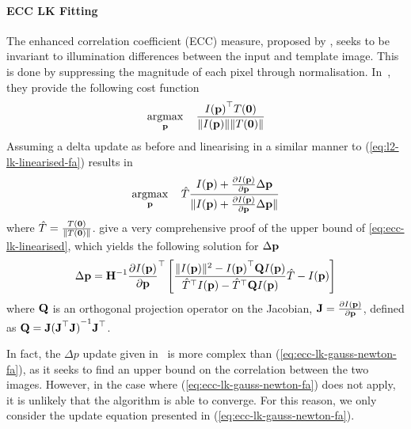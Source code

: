 \paragraph{ECC LK Fitting}\label{subsubsec:lk-ecc}
The enhanced correlation coefficient (ECC) measure, proposed by
\citet{evangelidis2008parametric}, seeks to be invariant to illumination differences
between the input and template image. This is done by suppressing the magnitude
of each pixel through normalisation. In~\cite{evangelidis2008parametric}, they provide the
following cost function
\begin{equation}\label{eq:ecc-lk-max}
   \argmax_{\p} \quad \frac{{I(\p)}^{\top} T(\zero)}{\norm{I(\p)} \norm{T(\zero)}}
\end{equation}
Assuming a delta update as before and linearising in a similar manner to
(\ref{eq:l2-lk-linearised-fa}) results in
\begin{equation}\label{eq:ecc-lk-linearised}
    \argmax_{\p} \quad \hat{T} \frac{I(\p) + \frac{\partial I(\p)}{\partial \p} \Delta \p}{\norm{{I(\p) + \frac{\partial I(\p)}{\partial \p} \Delta \p}}}
\end{equation}
where $\hat{T} = \frac{T(\boldsymbol{\mathbf{0}})}{\lVert{} T(\boldsymbol{\mathbf{0}}) \rVert}$.
\citet{evangelidis2008parametric} give a very comprehensive proof of
the upper bound of \cref{eq:ecc-lk-linearised}, which yields the
following solution for $\Delta \boldsymbol{\mathbf{p}}$
\begin{equation}\label{eq:ecc-lk-gauss-newton-fa}
    \Delta \boldsymbol{\mathbf{p}} = \boldsymbol{\mathbf{H}}^{-1} \frac{\partial I(\boldsymbol{\mathbf{p}})}{\partial \boldsymbol{\mathbf{p}}}^{\top} \left[ \frac{\lVert{} I(\boldsymbol{\mathbf{p}}) \rVert^2 - {I(\boldsymbol{\mathbf{p}})}^{\top} \boldsymbol{\mathbf{Q}} I(\boldsymbol{\mathbf{p}})}{\hat{T}^{\top} I(\boldsymbol{\mathbf{p}}) - \hat{T}^{\top} \boldsymbol{\mathbf{Q}} I(\boldsymbol{\mathbf{p}})} \hat{T} - I(\boldsymbol{\mathbf{p}}) \right]
\end{equation}
where $\boldsymbol{\mathbf{Q}}$ is an orthogonal projection operator on the Jacobian, $\boldsymbol{\mathbf{J}} =
\frac{\partial I(\boldsymbol{\mathbf{p}})}{\partial \boldsymbol{\mathbf{p}}}$, defined as $\boldsymbol{\mathbf{Q}} = \boldsymbol{\mathbf{J}} {(\boldsymbol{\mathbf{J}}^\top
\boldsymbol{\mathbf{J}})}^{-1} \boldsymbol{\mathbf{J}}^\top$.

In fact, the $\Delta p$ update given in~\cite{evangelidis2008parametric} 
is more complex than
(\ref{eq:ecc-lk-gauss-newton-fa}), as it seeks to find an upper bound on the
correlation between the two images. However, in the case where 
(\ref{eq:ecc-lk-gauss-newton-fa}) does not apply, it is unlikely that the 
algorithm is able to converge. For this reason, we only consider the update 
equation presented in (\ref{eq:ecc-lk-gauss-newton-fa}).
